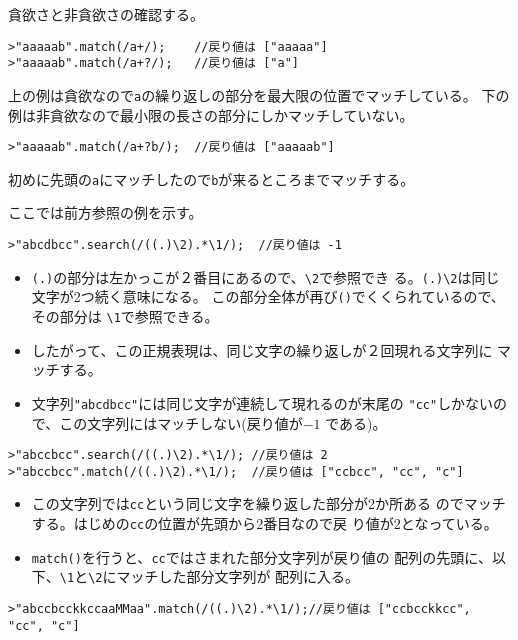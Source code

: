  \begin{Exec}\upshape\label{greedy} 貪欲さと非貪欲さの確認する。
\begin{Verbatim}
>"aaaaab".match(/a+/);    //戻り値は ["aaaaa"]
>"aaaaab".match(/a+?/);   //戻り値は ["a"]
\end{Verbatim}
上の例は貪欲なので\Verb+a+の繰り返しの部分を最大限の位置でマッチしている。
下の例は非貪欲なので最小限の長さの部分にしかマッチしていない。
\begin{Verbatim}
>"aaaaab".match(/a+?b/);  //戻り値は ["aaaaab"]
\end{Verbatim}
 初めに先頭の\Verb+a+にマッチしたので\Verb+b+が来るところまでマッチする。
 \end{Exec}
 \begin{Exec}\upshape
 ここでは前方参照の例を示す。
\begin{Verbatim}
>"abcdbcc".search(/((.)\2).*\1/);  //戻り値は -1
\end{Verbatim}
\begin{itemize}
 \item \Verb+(.)+の部分は左かっこが２番目にあるので、\Verb+\2+で参照でき
       る。\Verb+(.)\2+は同じ文字が2つ続く意味になる。
       この部分全体が再び\Verb+()+でくくられているので、その部分は
       \Verb+\1+で参照できる。
 \item したがって、この正規表現は、同じ文字の繰り返しが２回現れる文字列に
       マッチする。
 \item 文字列\Verb+"abcdbcc"+には同じ文字が連続して現れるのが末尾の
       \Verb+"cc"+しかないので、この文字列にはマッチしない(戻り値が$-1$
       である)。
\end{itemize}
\begin{Verbatim}
>"abccbcc".search(/((.)\2).*\1/); //戻り値は 2
>"abccbcc".match(/((.)\2).*\1/);  //戻り値は ["ccbcc", "cc", "c"]
\end{Verbatim}
\begin{itemize}
 \item この文字列では\Verb+cc+という同じ文字を繰り返した部分が2か所ある
       のでマッチする。はじめの\Verb+cc+の位置が先頭から$2$番目なので戻
       り値が$2$となっている。
 \item \Verb+match()+を行うと、\Verb+cc+ではさまれた部分文字列が戻り値の
       配列の先頭に、以下、\Verb+\1+と\Verb+\2+にマッチした部分文字列が
       配列に入る。
\end{itemize}
\begin{Verbatim}
>"abccbcckkccaaMMaa".match(/((.)\2).*\1/);//戻り値は ["ccbcckkcc", "cc", "c"]

\end{Verbatim}
\end{Exec}
